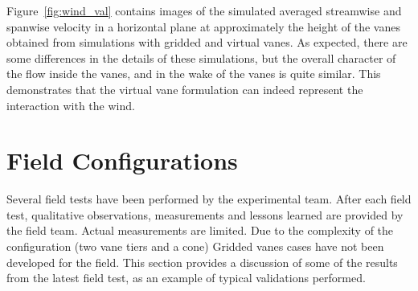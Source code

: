 



Figure~\ref{fig:wind_val} contains images of the simulated averaged
streamwise and  spanwise velocity in a horizontal plane at approximately
the height of the vanes obtained from simulations with gridded and
virtual vanes. As expected, there are some differences in the
details of these simulations, but the overall character of the flow
inside the vanes, and in the wake of the vanes is quite similar. This
demonstrates that the virtual vane formulation can indeed represent the
interaction with the wind. 

\section{Field Configurations}

Several field tests have been performed by the experimental team. After
each field test, qualitative observations, measurements and lessons
learned are provided by the field team. Actual measurements
are limited. Due to the complexity of the configuration
(two vane tiers and a cone) Gridded vanes cases have not been developed
for the field. This section provides a discussion of some of
the results from the latest field test, as an example of typical
validations performed. 

